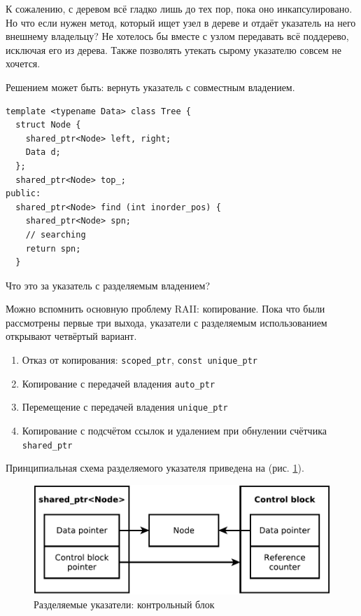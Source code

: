 \documentclass[a4paper,12pt,oneside]{article}
\begin{document}
К сожалению, с деревом всё гладко лишь до тех пор, пока оно инкапсулировано. Но что если нужен метод, который ищет узел в дереве и отдаёт указатель на него внешнему владельцу? Не хотелось бы вместе с узлом передавать всё поддерево, исключая его из дерева. Также позволять утекать сырому указателю совсем не хочется.

Решением может быть: вернуть указатель с совместным владением.

\begin{lstlisting}
template <typename Data> class Tree {
  struct Node {
    shared_ptr<Node> left, right;
    Data d;
  };
  shared_ptr<Node> top_;
public: 
  shared_ptr<Node> find (int inorder_pos) {
    shared_ptr<Node> spn;
    // searching
    return spn;
  }
\end{lstlisting}

Что это за указатель с разделяемым владением?

Можно вспомнить основную проблему RAII: копирование. Пока что были рассмотрены первые три выхода, указатели с разделяемым использованием открывают четвёртый вариант.

\begin{enumerate}
\item Отказ от копирования: \lstinline!scoped_ptr!, \lstinline!const unique_ptr!
\item Копирование с передачей владения \lstinline!auto_ptr!
\item Перемещение с передачей владения \lstinline!unique_ptr!
\item Копирование с подсчётом ссылок и удалением при обнулении счётчика \lstinline!shared_ptr! 
\end{enumerate}

Принципиальная схема разделяемого указателя приведена на (рис. \ref{fig:smartptrs-outer}).

\begin{figure}[ht]
\centering
\includegraphics[width=1.0\textwidth]{illustrations/smartptrs-outer-crop.pdf}
\caption{Разделяемые указатели: контрольный блок}
\label{fig:smartptrs-outer}
\end{figure}
\end{document}
